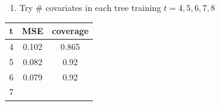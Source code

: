 \documentclass[]{article}
\providecommand{\tightlist}{%
  \setlength{\itemsep}{0pt}\setlength{\parskip}{0pt}}
\begin{document}
\begin{enumerate}
\def\labelenumi{\arabic{enumi}.}
\setcounter{enumi}{1}
\tightlist
\item
  Try \# covariates in each tree training \(t = 4, 5, 6, 7, 8\)
\end{enumerate}

\begin{longtable}[]{@{}ccc@{}}
\toprule
\begin{minipage}[b]{0.05\columnwidth}\centering\strut
t\strut
\end{minipage} & \begin{minipage}[b]{0.10\columnwidth}\centering\strut
MSE\strut
\end{minipage} & \begin{minipage}[b]{0.13\columnwidth}\centering\strut
coverage\strut
\end{minipage}\tabularnewline
\midrule
\endhead
\begin{minipage}[t]{0.05\columnwidth}\centering\strut
4\strut
\end{minipage} & \begin{minipage}[t]{0.10\columnwidth}\centering\strut
0.102\strut
\end{minipage} & \begin{minipage}[t]{0.13\columnwidth}\centering\strut
0.865\strut
\end{minipage}\tabularnewline
\begin{minipage}[t]{0.05\columnwidth}\centering\strut
5\strut
\end{minipage} & \begin{minipage}[t]{0.10\columnwidth}\centering\strut
0.082\strut
\end{minipage} & \begin{minipage}[t]{0.13\columnwidth}\centering\strut
0.92\strut
\end{minipage}\tabularnewline
\begin{minipage}[t]{0.05\columnwidth}\centering\strut
6\strut
\end{minipage} & \begin{minipage}[t]{0.10\columnwidth}\centering\strut
0.079\strut
\end{minipage} & \begin{minipage}[t]{0.13\columnwidth}\centering\strut
0.92\strut
\end{minipage}\tabularnewline
\begin{minipage}[t]{0.05\columnwidth}\centering\strut
7\strut
\end{minipage} & \begin{minipage}[t]{0.10\columnwidth}\centering\strut

\end{minipage}
\end{longtable}
\end{document}
